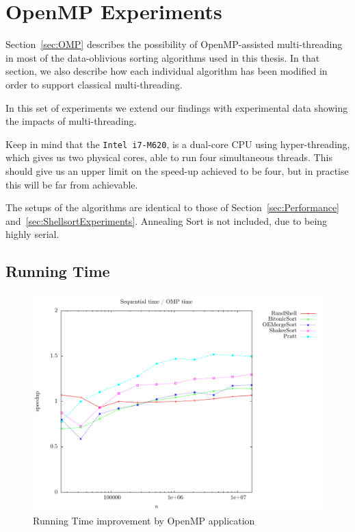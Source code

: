 \FloatBarrier
\section{OpenMP Experiments}
\label{sec:OMPExperiments}

Section~\ref{sec:OMP} describes the possibility of OpenMP-assisted multi-threading in most of the data-oblivious sorting algorithms used in this thesis. In that section, we also describe how each individual algorithm has been modified in order to support classical multi-threading.

In this set of experiments we extend our findings with experimental data showing the impacts of multi-threading.

Keep in mind that the \texttt{Intel i7-M620}, is a dual-core CPU using hyper-threading, which gives us two physical cores, able to run four simultaneous threads. This should give us an upper limit on the speed-up achieved to be four, but in practise this will be far from achievable. 

The setups of the algorithms are identical to those of Section~\ref{sec:Performance} and~\ref{sec:ShellsortExperiments}. Annealing Sort is not included, due to being highly serial.

\subsection{Running Time}

\begin{figure}
\center
\includegraphics[width=\textwidth]{graphs/OMP/timediff.pdf}
\caption{Running Time improvement by OpenMP application}
\label{fig:OMP:timediff}
\end{figure}

